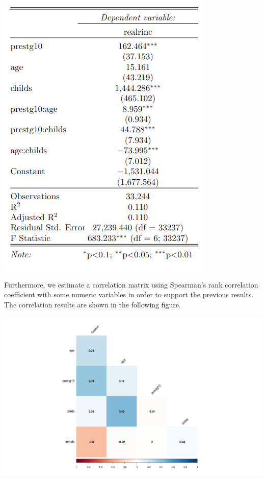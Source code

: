 \documentclass[11pt,a4paper]{article}
\let\origfigure\figure
\let\endorigfigure\endfigure
\renewenvironment{figure}[1][2] {
    \expandafter\origfigure\expandafter[H]
} {
    \endorigfigure
}
\begin{document}
\begin{figure}
\centering
\includegraphics{includes/reg_table.png}
\caption{table}
\end{figure}

Furthermore, we estimate a correlation matrix using Spearman's rank
correlation coefficient with some numeric variables in order to support
the previous results. The correlation results are shown in the following
figure.

\begin{figure}
\centering
\includegraphics{includes/corr_matrix.png}
\caption{matrix\_corr}
\end{figure}
\end{document}
